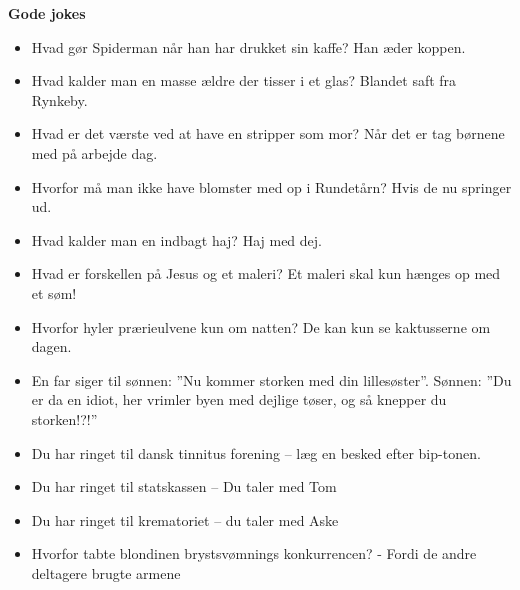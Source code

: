 \textbf{Gode jokes}
\begin{itemize}
  \item Hvad gør Spiderman når han har drukket sin kaffe? Han æder koppen.
  \item Hvad kalder man en masse ældre der tisser i et glas? Blandet saft fra Rynkeby.
  \item Hvad er det værste ved at have en stripper som mor? Når det er tag børnene med på arbejde dag.
  \item Hvorfor må man ikke have blomster med op i Rundetårn? Hvis de nu springer ud.
  \item Hvad kalder man en indbagt haj? Haj med dej.
  \item Hvad er forskellen på Jesus og et maleri? Et maleri skal kun hænges op med et søm!
  \item Hvorfor hyler prærieulvene kun om natten? De kan kun se kaktusserne om dagen.
  \item En far siger til sønnen: ''Nu kommer storken med din lillesøster''. Sønnen: ''Du er da en idiot, her vrimler byen med dejlige tøser, og så knepper du storken!?!''
  \item Du har ringet til dansk tinnitus forening – læg en besked efter bip-tonen.
  \item Du har ringet til statskassen – Du taler med Tom
  \item Du har ringet til krematoriet – du taler med Aske
  \item Hvorfor tabte blondinen brystsvømnings konkurrencen? - Fordi de andre deltagere brugte armene
\end{itemize}

